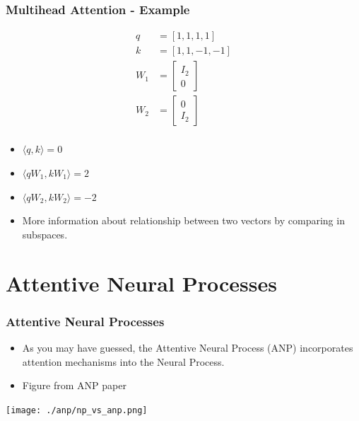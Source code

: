 \documentclass[t]{beamer}
\begin{document}
    \begin{frame}
      \frametitle{Multihead Attention - Example} 
      \[
        \begin{split}
          q   &= [1, 1, 1, 1] \\
          k   &= [1, 1, -1, -1]\\
          W_1 &= \begin{bmatrix} I_2 \\ 0\end{bmatrix} \\
          W_2 &= \begin{bmatrix} 0 \\ I_2\end{bmatrix} \\
        \end{split}
      \]
      \begin{itemize}
      \item $\langle q, k \rangle = 0$
      \item $\langle qW_1, kW_1 \rangle = 2$
      \item $\langle qW_2, kW_2 \rangle = -2$
      \item More information about relationship between two vectors by comparing in subspaces.
      \end{itemize}
    \end{frame}

\section{Attentive Neural Processes}

\begin{frame}
  \frametitle{Attentive Neural Processes} 
  \begin{itemize}
  \item As you may have guessed, the Attentive Neural Process (ANP) incorporates
    attention mechanisms into the Neural Process.
  \item Figure from ANP paper
  \end{itemize}
\texttt{[image: ./anp/np\_vs\_anp.png]}
\end{frame}
\end{document}

